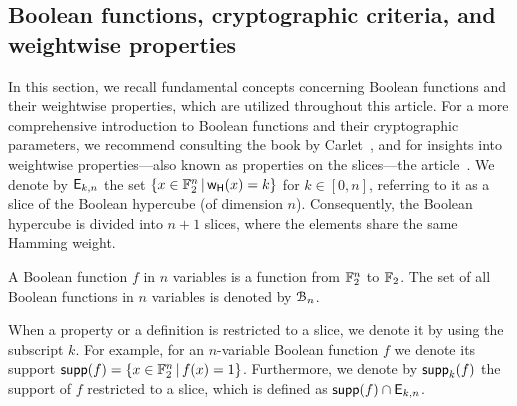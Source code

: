 \documentclass[11pt]{llncs}
\begin{document}

\subsection{Boolean functions, cryptographic criteria, and weightwise properties}
In this section, we recall fundamental concepts concerning Boolean functions and their weightwise properties, which are utilized throughout this article. For a more comprehensive introduction to Boolean functions and their cryptographic parameters, we recommend consulting the book by Carlet~\cite{Carlet20},
and for insights into weightwise properties—also known as properties on the slices—the article~\cite{TOSC:CarMeaRot17}.
We denote by $\mathsf{E}_{k,n}$ the set $\{x\in \mathbb{F}_2^n \, | \, \mathsf{w_H}(x)=k \}$ for $k \in [0,n]$, referring to it as a slice of the Boolean hypercube (of dimension $n$). 
Consequently, the Boolean hypercube is divided into $n+1$ slices, where the elements share the same Hamming weight.


\begin{definition}\label{def:bool_f}
	A Boolean function $f$ in $n$ variables is a function from $\mathbb{F}_2^n$ to $\mathbb{F}_2$. 
	The set of all Boolean functions in $n$ variables is denoted by $\mathcal{B}_n$.%
\end{definition}


When a property or a definition is restricted to a slice, we denote it by using the subscript $k$. 
For example, for an $n$-variable Boolean function $f$ we denote its support $\mathsf{supp}(f)=\{x\in \mathbb{F}_2^n \, | \, f(x)=1  \}$. 
Furthermore, we denote by $\mathsf{supp}_{k}(f)$ the support of $f$ restricted to a slice, which is defined as $\mathsf{supp}(f)\cap \mathsf{E}_{k,n}$.
\end{document}
